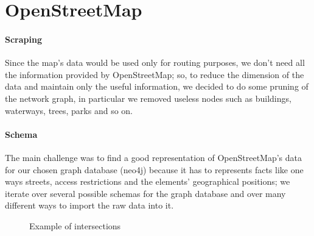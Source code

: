 \section{OpenStreetMap}

\paragraph{Scraping}
Since the map’s data would be used only for routing purposes, we don’t need all 
the information provided by OpenStreetMap; so, to reduce the dimension of the 
data and maintain only the useful information, we decided to do some pruning of 
the network graph, in particular we removed useless nodes such as buildings, 
waterways, trees, parks and so on.

\paragraph{Schema}
The main challenge was to find a good representation of OpenStreetMap’s data 
for our chosen graph database (neo4j) because it has to represents facts like 
one ways streets, access restrictions and the elements’ geographical positions; 
we iterate over several possible schemas for the graph database and over many 
different ways to import the raw data into it.

\begin{figure}[H]
	
	\caption{Example of intersections}
\end{figure}

